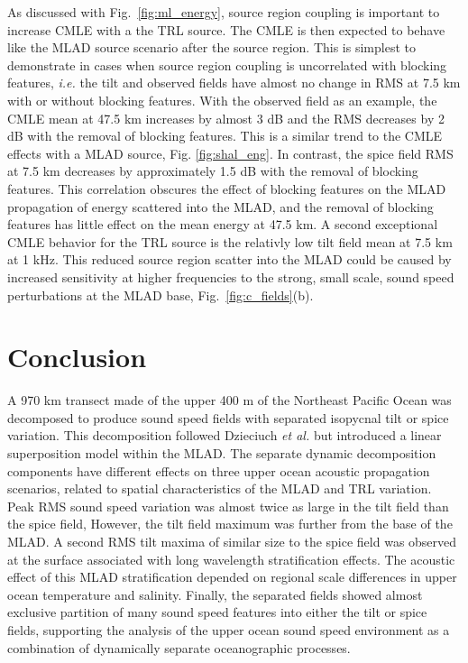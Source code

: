 \documentclass[preprint,NumberedRefs]{JASA}
\begin{document}
As discussed with Fig.~\ref{fig:ml_energy}, source region coupling is important to increase CMLE with a the TRL source. The CMLE is then expected to behave like the MLAD source scenario after the source region. This is simplest to demonstrate in cases when source region coupling is uncorrelated with blocking features, \emph{i.e.} the tilt and observed fields have almost no change in RMS at 7.5 km with or without blocking features. With the observed field as an example, the CMLE mean at 47.5 km increases by almost 3 dB and the RMS decreases by 2 dB with the removal of blocking features. This is a similar trend to the CMLE effects with a MLAD source, Fig. \ref{fig:shal_eng}. In contrast, the spice field RMS at 7.5 km decreases by approximately 1.5 dB with the removal of blocking features. This correlation obscures the effect of blocking features on the MLAD propagation of energy scattered into the MLAD, and the removal of blocking features has little effect on the mean energy at 47.5 km. A second exceptional CMLE behavior for the TRL source is the relativly low tilt field mean at 7.5 km at 1 kHz. This reduced source region scatter into the MLAD could be caused by increased sensitivity at higher frequencies to the strong, small scale, sound speed perturbations at the MLAD base, Fig.~\ref{fig:c_fields}(b).

\section{Conclusion}\label{sec:conclusion}
A 970 km transect made of the upper 400 m of the Northeast Pacific Ocean was decomposed to produce sound speed fields with separated isopycnal tilt or spice variation. This decomposition followed Dzieciuch \emph{et al.}\citep{dzieciuch2004} but introduced a linear superposition model within the MLAD. The separate dynamic decomposition components have different effects on three upper ocean acoustic propagation scenarios, related to spatial characteristics of the MLAD and TRL variation. Peak RMS sound speed variation was almost twice as large in the tilt field than the spice field, However, the tilt field maximum was further from the base of the MLAD. A second RMS tilt maxima of similar size to the spice field was observed at the surface associated with long wavelength stratification effects. The acoustic effect of this MLAD stratification depended on regional scale differences in upper ocean temperature and salinity. Finally, the separated fields showed almost exclusive partition of many sound speed features into either the tilt or spice fields, supporting the analysis of the upper ocean sound speed environment as a combination of dynamically separate oceanographic processes.
\end{document}
